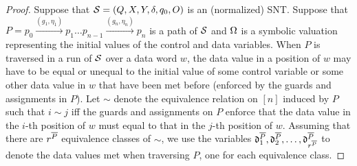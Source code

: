 \begin{appendix}
\begin{proof}
Suppose that ${\mathcal{S} }=(Q,X,Y, \delta,q_0,O)$ is an (normalized) SNT. Suppose that $P=p_0 \xrightarrow{(g_1,\eta_1)} p_1 \dots p_{n-1} \xrightarrow{(g_n,\eta_n)} p_{n}$ is a path of ${\mathcal{S} }$ and $\Omega$ is a symbolic valuation representing the  initial values of the control and data variables.  When $P$ is traversed in a run of ${\mathcal{S} }$ over a data word $w$,  the data value in a position of $w$ may have to be equal or unequal to the initial value of some control variable or some other data value in $w$ that have been met before (enforced by the guards and assignments in $P$). Let $\sim$ denote the equivalence relation on $[n]$ induced by $P$ such that $i \sim j$ iff the guards and assignments on $P$ enforce that the data value in the $i$-th position of $w$ must equal to that in the $j$-th position of $w$. Assuming that there are $r^{\overline{P}}$ equivalence classes of $\sim$, we use the variables $\mathfrak{d}^{\overline{P}}_1,\mathfrak{d}^{\overline{P}}_2,\dots, \mathfrak{d}^{\overline{P}}_{r^{\overline{P}}}$ to denote the data values met when traversing $P$, one for each equivalence class. 


\end{proof}
\end{appendix}
